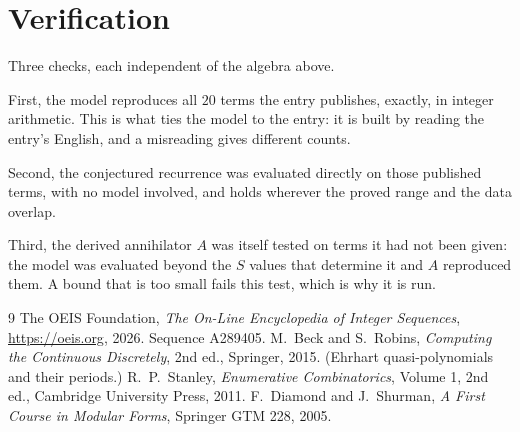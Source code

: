 \documentclass[11pt,a4paper]{article}
\theoremstyle{plain}
\theoremstyle{definition}
\begin{document}
\section{Verification}

Three checks, each independent of the algebra above.

First, the model reproduces all $20$ terms the entry publishes, exactly, in integer
arithmetic. This is what ties the model to the entry: it is built by reading the entry's
English, and a misreading gives different counts.

Second, the conjectured recurrence was evaluated directly on those published terms, with no
model involved, and holds wherever the proved range and the data overlap.

Third, the derived annihilator $A$ was itself tested on terms it had not been given: the model
was evaluated beyond the $S$ values that determine it and $A$ reproduced them. A bound that is
too small fails this test, which is why it is run.

\begin{thebibliography}{9}
 The OEIS Foundation, \emph{The On-Line Encyclopedia of Integer
Sequences}, \url{https://oeis.org}, 2026. Sequence A289405.
 M.~Beck and S.~Robins, \emph{Computing the Continuous Discretely},
2nd ed., Springer, 2015. (Ehrhart quasi-polynomials and their periods.)
 R.~P.~Stanley, \emph{Enumerative Combinatorics}, Volume 1, 2nd ed.,
Cambridge University Press, 2011.
 F.~Diamond and J.~Shurman, \emph{A First Course in Modular Forms},
Springer GTM 228, 2005.
\end{thebibliography}
\end{document}
